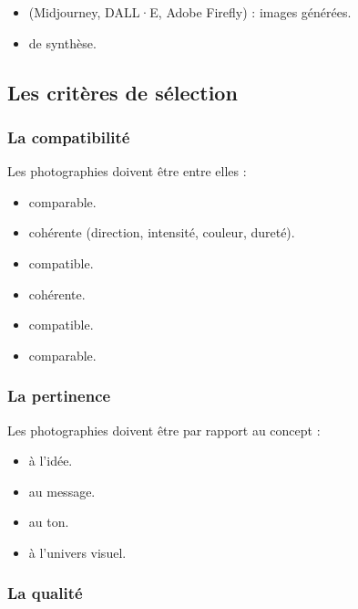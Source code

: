 \begin{itemize}
    \item {} (Midjourney, DALL·E, Adobe Firefly) : images générées.
    \item {} de synthèse.
\end{itemize}

\subsection{Les critères de sélection}

\subsubsection{La compatibilité}

Les photographies doivent être  entre elles :

\begin{itemize}
    \item {} comparable.
    \item {} cohérente (direction, intensité, couleur, dureté).
    \item {} compatible.
    \item {} cohérente.
    \item {} compatible.
    \item {} comparable.
\end{itemize}

\subsubsection{La pertinence}

Les photographies doivent être  par rapport au concept :

\begin{itemize}
    \item {} à l'idée.
    \item {} au message.
    \item {} au ton.
    \item {} à l'univers visuel.
\end{itemize}

\subsubsection{La qualité}

